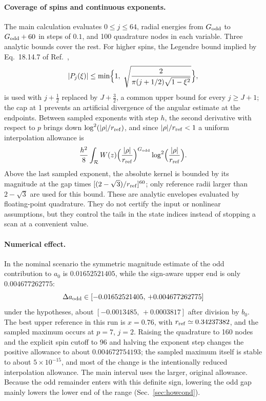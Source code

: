 \documentclass[11pt,a4paper]{article}
\numberwithin{equation}{section}
\newcommand{\sci}[2]{#1\times10^{#2}}
\begin{document}
\paragraph{Coverage of spins and continuous exponents.} The main calculation evaluates $0\le j\le64$, radial energies
from $G_{\rm odd}$ to $G_{\rm odd}+60$ in steps of $0.1$, and 100 quadrature nodes in each variable. Three analytic
bounds cover the rest. For higher spins, the Legendre bound implied by Eq.~18.14.7 of Ref.~\cite{NIST:DLMF},
\begin{equation}
 |P_j(\xi)|\le\min\Bigl\{1,\ \sqrt{\frac{2}{\pi(j+1/2)\sqrt{1-\xi^2}}}\Bigr\},
 \label{eq:cone:legendre}
\end{equation}
is used with $j+\frac12$ replaced by $J+\frac32$, a common upper bound for every $j\ge J+1$; the cap at 1 prevents an
artificial divergence of the angular estimate at the endpoints. Between sampled exponents with step $h$, the second
derivative with respect to $p$ brings down $\log^2(|\rho|/r_{\rm ref})$, and since $|\rho|/r_{\rm ref}<1$ a uniform
interpolation allowance is
\begin{equation}
 \frac{h^2}{8}\int_{\mathcal R}W(z)\Bigl(\frac{|\rho|}{r_{\rm ref}}\Bigr)^{G_{\rm odd}}\log^2\Bigl(\frac{|\rho|}{r_{\rm ref}}\Bigr).
 \label{eq:cone:interp}
\end{equation}
Above the last sampled exponent, the absolute kernel is bounded by its magnitude at the gap times
$[(2-\sqrt3)/r_{\rm ref}]^{60}$; only reference radii larger than $2-\sqrt3$ are used for this bound. These are
analytic envelopes evaluated by floating-point quadrature. They do not certify the input or nonlinear assumptions, but
they control the tails in the state indices instead of stopping a scan at a convenient value.

\paragraph{Numerical effect.} In the nominal scenario the symmetric magnitude estimate of the odd contribution to $a_0$
is $0.01652521405$, while the sign-aware upper end is only $0.004677262775$:
\begin{equation}
 \Delta a_{\rm odd}\in[-0.01652521405,\,+0.004677262775]
 \label{eq:cone:oddint}
\end{equation}
under the hypotheses, about $[-0.0013485,\,+0.0003817]$ after division by $b_0$. The best upper reference in this run is
$x=0.76$, with $r_{\rm ref}\simeq0.34237382$, and the sampled maximum occurs at $p=7$, $j=2$. Raising the quadrature to
160 nodes and the explicit spin cutoff to 96 and halving the exponent step changes the positive allowance to about
$0.004672754193$; the sampled maximum itself is stable to about $\sci{5}{-15}$, and most of the change is the
intentionally reduced interpolation allowance. The main interval uses the larger, original allowance. Because the odd
remainder enters with this definite sign, lowering the odd gap mainly lowers the lower end of the range
(Sec.~\ref{sec:howcond}).
\end{document}

